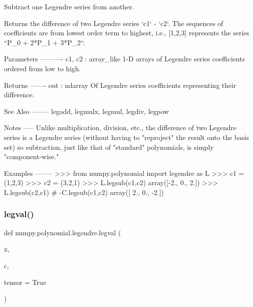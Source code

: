 \begin{DoxyVerb}Subtract one Legendre series from another.

Returns the difference of two Legendre series `c1` - `c2`.  The
sequences of coefficients are from lowest order term to highest, i.e.,
[1,2,3] represents the series ``P_0 + 2*P_1 + 3*P_2``.

Parameters
----------
c1, c2 : array_like
    1-D arrays of Legendre series coefficients ordered from low to
    high.

Returns
-------
out : ndarray
    Of Legendre series coefficients representing their difference.

See Also
--------
legadd, legmulx, legmul, legdiv, legpow

Notes
-----
Unlike multiplication, division, etc., the difference of two Legendre
series is a Legendre series (without having to "reproject" the result
onto the basis set) so subtraction, just like that of "standard"
polynomials, is simply "component-wise."

Examples
--------
>>> from numpy.polynomial import legendre as L
>>> c1 = (1,2,3)
>>> c2 = (3,2,1)
>>> L.legsub(c1,c2)
array([-2.,  0.,  2.])
>>> L.legsub(c2,c1) # -C.legsub(c1,c2)
array([ 2.,  0., -2.])\end{DoxyVerb}
 \mbox{\label{namespacenumpy_1_1polynomial_1_1legendre_ae714af9e011ed4987215df6065fc26fa}} 
\subsubsection{\texorpdfstring{legval()}{legval()}}
{\footnotesize\ttfamily def numpy.\+polynomial.\+legendre.\+legval (\begin{DoxyParamCaption}\item[{}]{x,  }\item[{}]{c,  }\item[{}]{tensor = {\ttfamily True} }\end{DoxyParamCaption})}


